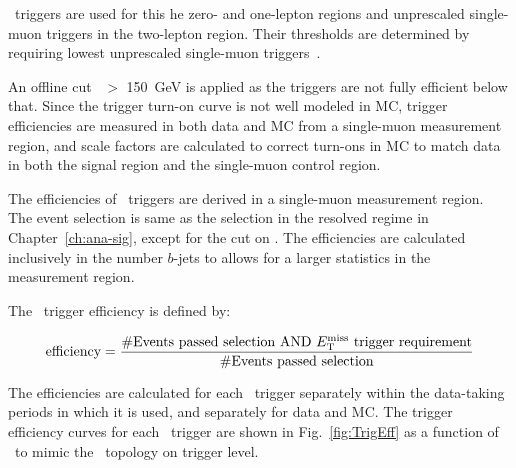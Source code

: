 \par \MET~triggers are used for this he zero- and one-lepton regions and unprescaled single-muon triggers in the two-lepton region. 
Their thresholds are determined by requiring lowest unprescaled single-muon triggers~\cite{lowest_unprescaled_triggers}. 

\par An offline cut \MET~$>$ 150~GeV is applied as the triggers are not fully efficient below that. Since the trigger turn-on curve is not well modeled in MC,
 trigger efficiencies are measured in both data and MC from a single-muon measurement region, and scale factors are calculated to correct
turn-ons in MC to match data in both the signal region and the single-muon control region.

\par The efficiencies of \MET~triggers are derived in a single-muon measurement region.
The event selection is same as the selection in the resolved regime in Chapter~\ref{ch:ana-sig}, except for the cut on \met.
The efficiencies are calculated inclusively in the number $b$-jets to allows for a larger statistics in the measurement region.

\par The \MET~trigger efficiency is defined by:

\begin{equation}
	\label{eq:trigeff}
	\text{efficiency} = \frac{\text{\#Events passed selection AND \ensuremath{E_{\mathrm{T}}^{\mathrm{miss}}}~trigger requirement}}{\text{\#Events passed selection}}
\end{equation}

\par The efficiencies are calculated for each \MET~trigger separately within the data-taking periods in which it is used, and separately for data and MC.
 The trigger efficiency curves for each \MET~trigger are shown in Fig.~\ref{fig:TrigEff} as a function of \METnomu~to mimic the \MET~topology on trigger level.

